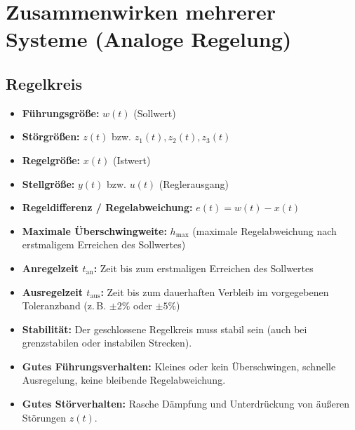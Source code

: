 \section{Zusammenwirken mehrerer Systeme (Analoge Regelung)}

\subsection{Regelkreis}
\begin{tcolorbox}
\begin{itemize}
  \item \textbf{Führungsgröße:} $w(t)$ (Sollwert)
  \item \textbf{Störgrößen:} $z(t)$ bzw. $z_1(t), z_2(t), z_3(t)$
  \item \textbf{Regelgröße:} $x(t)$ (Istwert)
  \item \textbf{Stellgröße:} $y(t)$ bzw. $u(t)$ (Reglerausgang)
  \item \textbf{Regeldifferenz / Regelabweichung:} $e(t) = w(t) - x(t)$
  \item \textbf{Maximale Überschwingweite:} $h_{\max}$ (maximale Regelabweichung nach erstmaligem Erreichen des Sollwertes)
  \item \textbf{Anregelzeit $t_{\text{an}}$:} Zeit bis zum erstmaligen Erreichen des Sollwertes
  \item \textbf{Ausregelzeit $t_{\text{aus}}$:} Zeit bis zum dauerhaften Verbleib im vorgegebenen Toleranzband (z.\,B. $\pm 2\%$ oder $\pm 5\%$)
\end{itemize}
\end{tcolorbox}

\begin{tcolorbox}
\begin{itemize}
  \item \textbf{Stabilität:} Der geschlossene Regelkreis muss stabil sein (auch bei grenzstabilen oder instabilen Strecken).
  \item \textbf{Gutes Führungsverhalten:} Kleines oder kein Überschwingen, schnelle Ausregelung, keine bleibende Regelabweichung.
  \item \textbf{Gutes Störverhalten:} Rasche Dämpfung und Unterdrückung von äußeren Störungen $z(t)$.
\end{itemize}
\end{tcolorbox}

